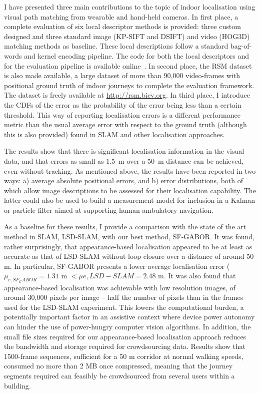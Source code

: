 I have presented three main contributions to the topic of indoor localisation using visual path matching from wearable and hand-held cameras. In first place, a complete evaluation of six local descriptor methods is provided: three custom designed and three standard image (KP-SIFT and DSIFT) and video (HOG3D) matching methods as baseline. These local descriptions follow a standard bag-of-words and kernel encoding pipeline. The code for both the local descriptors and for the evaluation pipeline is available online~\cite{jose_rivera_rubio_2015_33762}. In second place, the RSM dataset is also made available, a large dataset of more than 90,000 video-frames with positional ground truth of indoor journeys to complete the evaluation framework. The dataset is freely available at \url{http://rsm.bicv.org}. In third place, I introduce the CDFs of the error as the probability of the error being less than a certain threshold. This way of reporting localisation errors is a different performance metric than the usual average error with respect to the ground truth (although this is also provided) found in SLAM and other localisation approaches.

The results show that there is significant localisation information in the visual data, and that errors as small as \SI{1.5}{m} over a \SI{50}{m} distance can be achieved, even without tracking. As mentioned above, the results have been reported in two ways: a) average absolute positional errors, and b) error distributions, both of which allow image descriptions to be assessed for their localisation capability.  The latter could also be used to build a measurement model for inclusion in a Kalman or particle filter  aimed at supporting human ambulatory navigation. 

As a baseline for these results, I provide a comparison with the state of the art method in SLAM, LSD-SLAM, with our best method, SF-GABOR. It was found, rather surprisingly, that appearance-based localisation appeared to be at least as accurate as that of LSD-SLAM without loop closure over a distance of around 50 m. In particular, SF-GABOR presents a lower average localisation error ($\mu_{e,SF_GABOR} = 1.31 $ m $< \mu{e,LSD-SLAM} = 2.48 $ m. It was also found that appearance-based localisation was achievable with low resolution images, of around 30,000 pixels per image -- half the number of pixels than in the frames used for the LSD-SLAM experiment. This lowers the computational burden, a potentially important factor in an assistive context where device power autonomy can hinder the use of power-hungry computer vision algorithms. In addition, the small file sizes required for our appearance-based localisation approach reduces the bandwidth and storage required for crowdsourcing data. Results show that 1500-frame sequences, sufficient for a 50 m corridor at normal walking speeds, consumed no more than 2 MB once compressed, meaning that the journey segments required can feasibly be crowdsourced from several users within a building.

